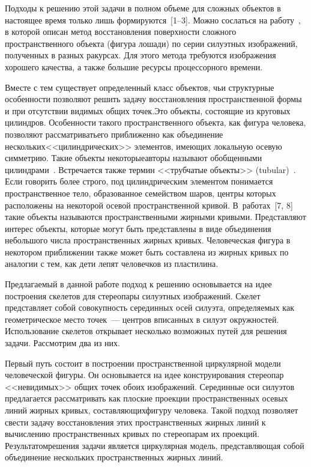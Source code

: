 \begin{multicols}{2}
     Подходы к решению этой задачи в полном объеме для сложных объектов 
в настоящее время только лишь формируются~[1--3]. Можно сослаться на работу~\cite{1ts}, 
в которой описан метод восстановления поверхности сложного 
пространственного объекта (фигура лошади) по серии силуэтных изображений, 
полученных в разных ракурсах. Для этого метода требуются изображения 
хорошего качества, а также большие ресурсы процессорного времени.
     
     Вместе с тем существует определенный класс объектов, чьи структурные 
особенности позволяют решить задачу восстановления пространственной 
формы и при отсутствии видимых общих точек.\linebreak Это объекты, состоящие из 
круговых цилиндров. Особенности такого пространственного объекта, как 
фигура человека, позволяют рассматривать\linebreak его приближенно как объединение 
нескольких\linebreak <<цилиндрических>> элементов, имеющих локальную осевую 
симметрию. Такие объекты некоторые\linebreak авторы называют обобщенными 
цилиндрами~\cite{2ts}. Встречается также термин <<трубчатые объекты>> 
(tubular)~\cite{3ts}. Если говорить более строго, под цилиндрическим элементом 
понимается пространственное тело, образованное семейством шаров, центры 
которых расположены на некоторой осевой пространственной кривой. 
В~работах~[7, 8] такие объекты называются пространственными жирными 
кривыми. Представляют интерес объекты, которые могут быть представлены в 
виде объединения небольшого числа пространственных жирных кривых. 
Человеческая фигура в некотором приближении также может быть составлена 
из жирных кривых по аналогии с тем, как дети лепят человечков из 
пластилина.
     
     Предлагаемый в данной работе подход к решению основывается на идее 
построения скелетов для стереопары силуэтных изображений. Скелет 
представляет собой совокупность серединных осей силуэта, определяемых как 
геометрическое место точек~--- центров вписанных в силуэт окружностей. 
Использование скелетов открывает несколько возможных путей для решения 
задачи. Рассмотрим два из них. 
     
     Первый путь состоит в построении пространственной циркулярной 
модели человеческой фигуры. Он основывается на идее конструирования 
стереопар <<невидимых>> общих точек обоих изоб\-ра\-же\-ний. Серединные оси 
силуэтов предлагается рассматривать как плоские проекции пространственных 
осевых линий жирных кривых, составляющих\linebreak фигуру человека. Такой подход 
позволяет свести задачу восстановления этих пространственных жирных линий 
к вычислению пространственных кривых по стереопарам их проекций. 
Результатом\linebreak решения задачи является циркулярная модель, представляющая 
собой объединение нескольких пространственных жирных линий. 
     

\end{multicols}
